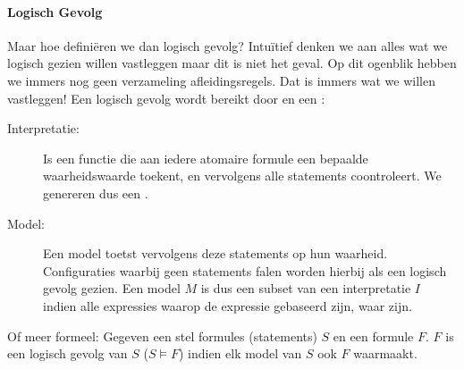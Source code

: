 \paragraph{Logisch Gevolg}
Maar hoe definiëren we dan logisch gevolg? Intuïtief denken we aan alles wat we logisch gezien willen vastleggen maar dit is niet het geval. Op dit ogenblik hebben we immers nog geen verzameling afleidingsregels. Dat is immers wat we willen vastleggen! Een logisch gevolg wordt bereikt door  en een :
\begin{description}
 \item[Interpretatie:]Is een functie die aan iedere atomaire formule een bepaalde waarheidswaarde toekent, en vervolgens alle statements coontroleert. We genereren dus een .
 \item[Model:]Een model toetst vervolgens deze statements op hun waarheid. Configuraties waarbij geen statements falen worden hierbij als een logisch gevolg gezien. Een model $M$ is dus een subset van een interpretatie $I$ indien alle expressies waarop de expressie gebaseerd zijn, waar zijn.
\end{description}
Of meer formeel: Gegeven een stel formules (statements) $S$ en een formule $F$. $F$ is een logisch gevolg van $S$ ($S\vDash F$) indien elk model van $S$ ook $F$ waarmaakt.
